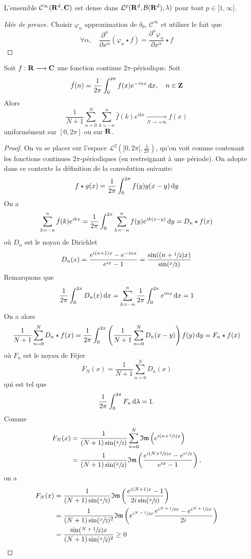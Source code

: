\begin{thm}
    L'ensemble $\mathcal  C^\infty(\mathbf R^d, \mathbf C)$ est dense dans $\mathcal  L^p(\mathbf R^d, \mathcal  B(\mathbf R^d), \lambda)$ pour tout $p \in  [1, \infty[$.
\end{thm}

\begin{proof}[Idée de preuve]
Choisir $\varphi_n$ approximation de  $\delta_0$,  $\mathcal  C^\infty$ et utiliser le fait que \[
    \forall  \alpha, \quad  \frac{\partial^\alpha}{\partial x^\alpha}(\varphi_n\star f)= \frac{\partial^\alpha \varphi_n}{\partial x^\alpha}\star f
\] 
\end{proof}

\begin{thm}
Soit $f:\mathbf R\longrightarrow \mathbf C$ une fonction continue  $2\pi$-périodique. Soit \[
    \hat{f}(n)=\frac{1}{2\pi}\int_0^{2\pi}f(x)e^{-inx}\mathop{}\!\mathrm d x, \quad  n \in  \mathbf Z
\]
Alors \[
    \frac{1}{N+1}\sum_{n=0}^N\sum_{k=-n}^n \hat{f}(k)e^{ikx} \xrightarrow[N\to +\infty]{}f(x)
\] 
uniformément sur $[0, 2\pi]$ ou sur $\mathbf R$.
\end{thm}

\begin{proof}
    On va se placer sur l'espace $\mathcal  L^2([0,2\pi[, \frac\lambda{2\pi})$, qu'on voit comme contenant les fonctions continues $2\pi$-périodiques (en restreignant à une période). On adopte dans ce contexte la définition de la convolution suivante: \[
        f\star g(x)= \frac{1}{2\pi}\int_0^{2\pi}f(y)g(x-y)\mathop{}\!\mathrm d y
    \] 
    On a \[
        \sum_{k=-n}^n \hat{f}(k)e^{ikx} = \frac{1}{2\pi}\int_0^{2\pi} \sum_{k=-n}^n f(y)e^{ik(x-y)}\mathop{}\!\mathrm d y=D_n\star f(x)
    \]
    où $D_n$ est le noyau de Dirichlet \[
        D_n(x)= \frac{e^{i(n+1)x}-e^{-inx}}{e^{ix}-1}= \frac{\sin((n+\sfrac12)x)}{\sin(\sfrac x2)}
    \] 
    Remarquons que \[
        \frac{1}{2\pi}\int_0^{2\pi} D_n(x)\mathop{}\!\mathrm d x=\sum_{k=-n}^n\frac{1}{2\pi}\int_0^{2\pi} e^{inx}\mathop{}\!\mathrm d x=1
    \]
    On a alors \[
        \frac{1}{N+1}\sum_{n=0}^N D_n\star f(x)=\frac{1}{2\pi}\int_0^{2\pi}\left(\frac{1}{N+1}\sum_{n=0}^ND_n(x-y)\right) f(y)\mathop{}\!\mathrm d y=F_n\star f(x)
    \] 
    où $F_n$ est le noyau de Féjer \[
        F_N(x)=\frac{1}{N+1}\sum_{n=0}^N D_n(x)
    \]
    qui est tel que \[
        \frac{1}{2\pi}\int_0^{2\pi}F_n\mathop{}\!\mathrm d \lambda=1.
    \] 
    Comme \begin{align*}
    F_N(x) &= \frac{1}{(N+1)\sin(\sfrac{x}{2})} \sum_{n=0}^{N} \mathfrak{Im}\left(e^{i(n+\sfrac12)x}\right)\\
&= \frac{1}{(N+1)\sin(\sfrac{x}{2})}\mathfrak{Im} \left( \frac{e^{i(N+\sfrac32)x}-e^{i\sfrac{x}{2}}}{e^{ix}-1}\right),
    \end{align*}
    on a 
    \begin{align*}
F_N(x) &= \frac{1}{(N+1)\sin(\sfrac{x}{2})}\mathfrak{Im} \left( \frac{e^{i(N+1)x}-1}{2i\sin(\sfrac{x}{2})}\right)\\
&= \frac{1}{(N+1)\sin(\sfrac{x}{2})^2}\mathfrak{Im} \left( e^{i \sfrac{N+1}{2}x}\frac{e^{i \sfrac{N+1}{2}x}-e^{i \sfrac{N+1}{2}x}}{2i}\right)\\
&= \frac{\sin(\sfrac{N+1}{2})x}{(N+1)\sin(\sfrac{x}{2})^2}\geq 0
\end{align*}
\end{proof}
